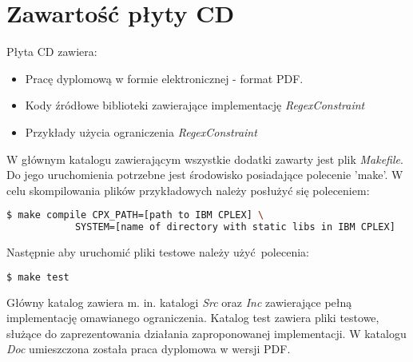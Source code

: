 \chapter{Zawartość płyty CD}
\thispagestyle{chapterBeginStyle}
\label{plytaCD}

Płyta CD zawiera:
\begin{itemize}
    \item Pracę dyplomową w formie elektronicznej - format PDF.
    \item Kody źródłowe biblioteki zawierające implementację \textit{RegexConstraint}
    \item Przykłady użycia ograniczenia \textit{RegexConstraint}
\end{itemize}

\par
W głównym katalogu zawierającym wszystkie dodatki zawarty jest plik \textit{Makefile}. Do jego uruchomienia potrzebne
jest środowisko posiadające polecenie 'make'. W celu skompilowania plików przykładowych należy posłużyć się poleceniem:
\begin{lstlisting}[language=bash]
    $ make compile CPX_PATH=[path to IBM CPLEX] \
            SYSTEM=[name of directory with static libs in IBM CPLEX]
\end{lstlisting}
Następnie aby uruchomić pliki testowe należy użyć polecenia:
\begin{lstlisting}[language=bash]
    $ make test
\end{lstlisting}

\par
Główny katalog zawiera m. in. katalogi \textit{Src} oraz \textit{Inc} zawierające pełną implementację omawianego ograniczenia.
Katalog test zawiera pliki testowe, służące do zaprezentowania działania zaproponowanej implementacji.
W katalogu \textit{Doc} umieszczona została praca dyplomowa w wersji PDF. 
